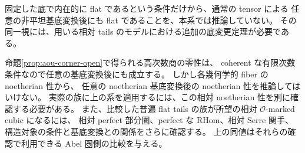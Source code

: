 固定した底で内在的に flat であるという条件だけから、通常の tensor による
任意の非平坦基底変換後にも flat であることを、本系では推論していない。
その同一視には、用いる相対 tails のモデルにおける追加の底変更定理が必要である。

\begin{remark}
\label{rem:relative-corner-scope}
命題\ref{prop:aou-corner-open}で得られる高次数商の零性は、
coherent な有限次数条件なので任意の基底変換後にも成立する。
しかし各幾何学的 fiber の noetherian 性から、
任意の noetherian 基底変換後の noetherian 性を推論してはいけない。
実際の族に上の系を適用するには、この相対 noetherian 性を別に確認する必要がある。
また、比較した普遍 flat tails の族が所望の相対 $\mathcal O$-marked cubic になるには、
相対 perfect 部分圏、perfect な RHom、相対 Serre 関手、
構造対象の条件と基底変換との関係をさらに確認する。
上の同値はそれらの確認で利用できる Abel 圏側の比較を与える。
\end{remark}
